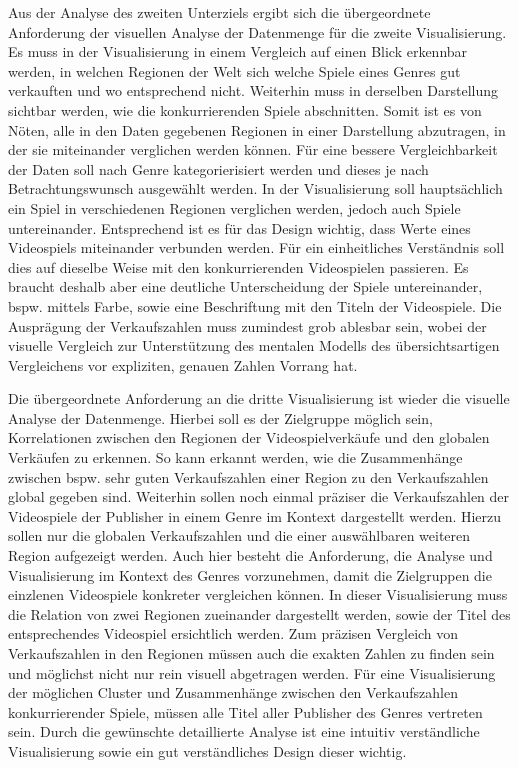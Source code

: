 \documentclass[usegeometry=true]{scrartcl}
\begin{document}
Aus der Analyse des zweiten Unterziels ergibt sich die übergeordnete Anforderung der visuellen Analyse der Datenmenge für die zweite Visualisierung. 
Es muss in der Visualisierung in einem Vergleich auf einen Blick erkennbar werden, in welchen Regionen der Welt sich welche Spiele eines Genres gut verkauften und wo entsprechend nicht. 
Weiterhin muss in derselben Darstellung sichtbar werden, wie die konkurrierenden Spiele abschnitten.
Somit ist es von Nöten, alle in den Daten gegebenen Regionen in einer Darstellung abzutragen, in der sie miteinander verglichen werden können. 
Für eine bessere Vergleichbarkeit der Daten soll nach Genre kategorierisiert werden und dieses je nach Betrachtungswunsch ausgewählt werden. 
In der Visualisierung soll hauptsächlich ein Spiel in verschiedenen Regionen verglichen werden, jedoch auch Spiele untereinander. 
Entsprechend ist es für das Design wichtig, dass Werte eines Videospiels miteinander verbunden werden. 
Für ein einheitliches Verständnis soll dies auf dieselbe Weise mit den konkurrierenden Videospielen passieren. 
Es braucht deshalb aber eine deutliche Unterscheidung der Spiele untereinander, bspw. mittels Farbe, sowie eine Beschriftung mit den Titeln der Videospiele.
Die Ausprägung der Verkaufszahlen muss zumindest grob ablesbar sein, wobei der visuelle Vergleich zur Unterstützung des mentalen Modells des übersichtsartigen Vergleichens vor expliziten, genauen Zahlen Vorrang hat.

Die übergeordnete Anforderung an die dritte Visualisierung ist wieder die visuelle Analyse der Datenmenge. 
Hierbei soll es der Zielgruppe möglich sein, Korrelationen zwischen den Regionen der Videospielverkäufe und den globalen Verkäufen zu erkennen. 
So kann erkannt werden, wie die Zusammenhänge zwischen bspw. sehr guten Verkaufszahlen einer Region zu den Verkaufszahlen global gegeben sind. 
Weiterhin sollen noch einmal präziser die Verkaufszahlen der Videospiele der Publisher in einem Genre im Kontext dargestellt werden. 
Hierzu sollen nur die globalen Verkaufszahlen und die einer auswählbaren weiteren Region aufgezeigt werden. 
Auch hier besteht die Anforderung, die Analyse und Visualisierung im Kontext des Genres vorzunehmen, damit die Zielgruppen die einzlenen Videospiele konkreter vergleichen können.
In dieser Visualisierung muss die Relation von zwei Regionen zueinander dargestellt werden, sowie der Titel des entsprechendes Videospiel ersichtlich werden. 
Zum präzisen Vergleich von Verkaufszahlen in den Regionen müssen auch die exakten Zahlen zu finden sein und möglichst nicht nur rein visuell abgetragen werden. 
Für eine Visualisierung der möglichen Cluster und Zusammenhänge zwischen den Verkaufszahlen konkurrierender Spiele, müssen alle Titel aller Publisher des Genres vertreten sein.
Durch die gewünschte detaillierte Analyse ist eine intuitiv verständliche Visualisierung sowie ein gut verständliches Design dieser wichtig. 
\end{document}
